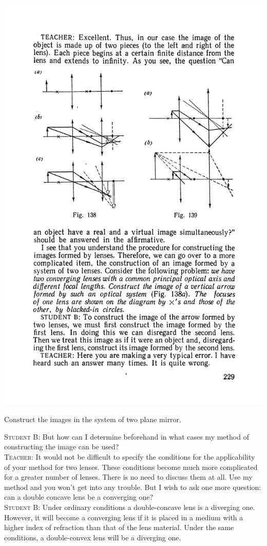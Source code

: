 \documentclass[a4paper,sfsidenotes]{tufte-book}
\begin{document}
\begin{marginfigure}%
\includegraphics[width=1.1\linewidth]{fig-139a}
\caption{Construct the images in the system of two plane mirror.}
\label{fig-139}
\end{marginfigure}
\textsc{Student B:} But how can I determine beforehand in what cases my method of constructing the image can be used?
\\
\textsc{Teacher:} It would not be difficult to specify the conditions for the applicability of your method for two lenses. These conditions become much more complicated for a greater number of lenses. There is no need to discuss them at all. Use my method and you won't get into any trouble. But I wish to ask one more question: can a double concave lens be a converging one?
\\
\textsc{Student B:} Under ordinary conditions a double-concave lens is a diverging one. However, it will become a converging lens if it is placed in a medium with a higher index of refraction than that of the lens material. Under the same conditions, a double-convex lens will be a diverging one.
\\
\end{document}
